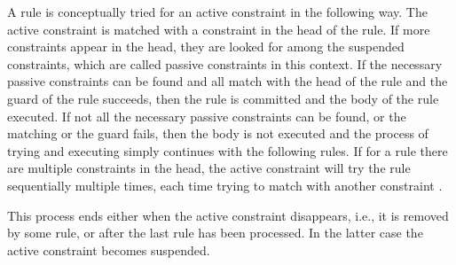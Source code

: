 \documentclass[thesis-solanki.tex]{subfiles}
\begin{document}
\begin{comment}
Under a declarative reading, the order of rules, and of goals within rules, is irrelevant since logical disjunction and conjunction are 
commutative.
Procedurally, however, it is often important to take into account \progLang{Prolog}'s execution strategy, either
for efficiency reasons, or due to the semantics of impure built-in predicates for which the order of evaluation
matters.
Also, as \progLang{Prolog} interpreters try to unify clauses in the order they're provided, failing to give a
correct ordering can lead to infinite recursion.
\end{comment}

\begin{comment}
In this subsection the operational semantics of CHR\endnote{%
  What is CHR?
}\elabel{CHR-query}
in Prolog are presented informally. They do not differ essentially from other CHR\eref{CHR-query} systems.
When a constraint\endnote{%
  In this context, what is a constraint?
}
is called, it is considered an active constraint and the system will try to apply the rules to it. Rules are tried and executed sequentially in the order they are written.
\end{comment}




A rule is conceptually tried for an active constraint in the following way.
The active constraint is matched with a constraint in the head of the rule.
If more constraints appear in the head, they are looked for among the suspended constraints, which are called
passive constraints in this context.
If the necessary passive constraints can be found and all match with the head of the rule and the guard of the rule
succeeds, then the rule is committed and the body of the rule executed.
If not all the necessary passive constraints can be found, or the matching or the guard fails, then the body is not
executed and the process of trying and executing simply continues with the following rules.
If for a rule there are multiple constraints in the head, the active constraint will try the rule sequentially
multiple times, each time trying to match with another constraint \cite{website:swiprologsyntaxandsemantics}.

This process ends either when the active constraint disappears, i.e., it is removed by some rule, or
after the last rule has been processed.
In the latter case the active constraint becomes suspended.
\end{document}
